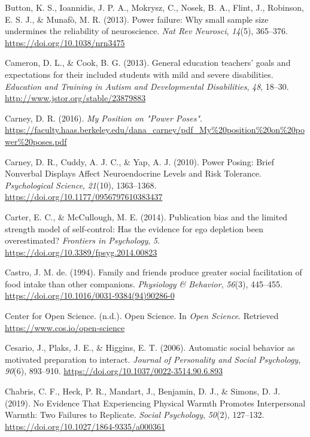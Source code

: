 \documentclass[
  letterpaper,
]{book}
\newlength{\cslhangindent}
\newenvironment{CSLReferences}[2] %
 {\begin{list}{}{%
  \setlength{\itemindent}{0pt}
  \setlength{\leftmargin}{0pt}
  \setlength{\parsep}{0pt}
  \ifodd #1
   \setlength{\leftmargin}{\cslhangindent}
   \setlength{\itemindent}{-1\cslhangindent}
  \fi
  \setlength{\itemsep}{#2\baselineskip}}}
 {\end{list}}
\begin{document}
\begin{CSLReferences}{1}{0}
Button, K. S., Ioannidis, J. P. A., Mokrysz, C., Nosek, B. A., Flint,
J., Robinson, E. S. J., \& Munafò, M. R. (2013). Power failure: Why
small sample size undermines the reliability of neuroscience. \emph{Nat
Rev Neurosci}, \emph{14}(5), 365--376.
\url{https://doi.org/10.1038/nrn3475}

Cameron, D. L., \& Cook, B. G. (2013). General education teachers' goals
and expectations for their included students with mild and severe
disabilities. \emph{Education and Training in Autism and Developmental
Disabilities}, \emph{48}, 18--30.
\url{http://www.jstor.org/stable/23879883}

Carney, D. R. (2016). \emph{My {Position} on "{Power} {Poses}"}.
\url{https://faculty.haas.berkeley.edu/dana_carney/pdf_My\%20position\%20on\%20power\%20poses.pdf}

Carney, D. R., Cuddy, A. J. C., \& Yap, A. J. (2010). Power {Posing}:
{Brief} {Nonverbal} {Displays} {Affect} {Neuroendocrine} {Levels} and
{Risk} {Tolerance}. \emph{Psychological Science}, \emph{21}(10),
1363--1368. \url{https://doi.org/10.1177/0956797610383437}

Carter, E. C., \& McCullough, M. E. (2014). Publication bias and the
limited strength model of self-control: Has the evidence for ego
depletion been overestimated? \emph{Frontiers in Psychology}, \emph{5}.
\url{https://doi.org/10.3389/fpsyg.2014.00823}

Castro, J. M. de. (1994). Family and friends produce greater social
facilitation of food intake than other companions. \emph{Physiology \&
Behavior}, \emph{56}(3), 445--455.
\url{https://doi.org/10.1016/0031-9384(94)90286-0}

Center for Open Science. (n.d.). Open {Science}. In \emph{Open Science}.
Retrieved \url{https://www.cos.io/open-science}

Cesario, J., Plaks, J. E., \& Higgins, E. T. (2006). Automatic social
behavior as motivated preparation to interact. \emph{Journal of
Personality and Social Psychology}, \emph{90}(6), 893--910.
\url{https://doi.org/10.1037/0022-3514.90.6.893}

Chabris, C. F., Heck, P. R., Mandart, J., Benjamin, D. J., \& Simons, D.
J. (2019). No {Evidence} {That} {Experiencing} {Physical} {Warmth}
{Promotes} {Interpersonal} {Warmth}: {Two} {Failures} to {Replicate}.
\emph{Social Psychology}, \emph{50}(2), 127--132.
\url{https://doi.org/10.1027/1864-9335/a000361}


\end{CSLReferences}
\end{document}
